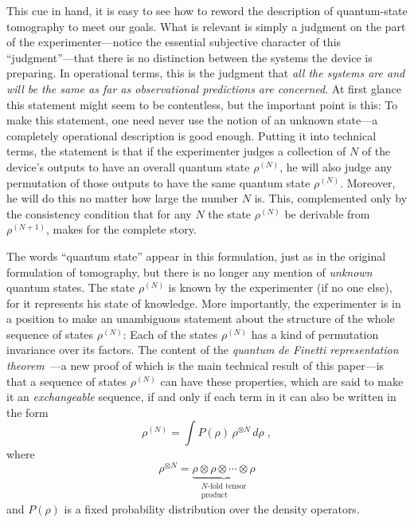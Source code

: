 \documentclass[12pt,aps,eqsecnum]{revtex4-1}
\begin{document}
This cue in hand, it is easy to see how to reword the description
of quantum-state tomography to meet our goals.  What is relevant
is simply a judgment on the part of the experimenter---notice the
essential subjective character of this ``judgment''---that there
is no distinction between the systems the device is preparing.  In
operational terms, this is the judgment that {\it all the systems
are and will be the same as far as observational predictions are
concerned}.  At first glance this statement might seem to be
contentless, but the important point is this: To make this
statement, one need never use the notion of an unknown state---a
completely operational description is good enough. Putting it into
technical terms, the statement is that if the experimenter judges
a collection of $N$ of the device's outputs to have an overall
quantum state $\rho^{(N)}$, he will also judge any permutation of
those outputs to have the same quantum state $\rho^{(N)}$.
Moreover, he will do this no matter how large the number $N$ is.
This, complemented only by the consistency condition that for any
$N$ the state $\rho^{(N)}$ be derivable from $\rho^{(N+1)}$, makes
for the complete story.

The words ``quantum state'' appear in this formulation, just as in
the original formulation of tomography, but there is no longer any
mention  of {\it unknown\/} quantum states.  The state $\rho^{(N)}$
is known by the experimenter (if no one else), for it represents his
state of knowledge.  More importantly, the experimenter is in a
position to make an unambiguous statement about the structure of the
whole sequence of states $\rho^{(N)}$: Each of the states
$\rho^{(N)}$ has a kind of permutation invariance over its factors.
The content of the {\it quantum de Finetti representation
theorem}~\cite{Hudson1976,Hudson1981}---a new proof of which is the
main technical result of this paper---is that a sequence of states
$\rho^{(N)}$ can have these properties, which are said to make it an
{\it exchangeable\/} sequence, if and only if each term in it can
also be written in the form
\begin{equation}
\rho^{(N)}=\int P(\rho)\, \rho^{\otimes N}\, d\rho\;,
\label{Jeremy}
\end{equation}
where
\begin{equation}
\rho^{\otimes N}=
\underbrace{\rho\otimes\rho\otimes\cdots\otimes\rho}_{
\begin{matrix}
\text{$N$-fold tensor} \\
\text{product}
\end{matrix}}
\end{equation}
and $P(\rho)$ is a fixed probability distribution over the density
operators.
\end{document}
